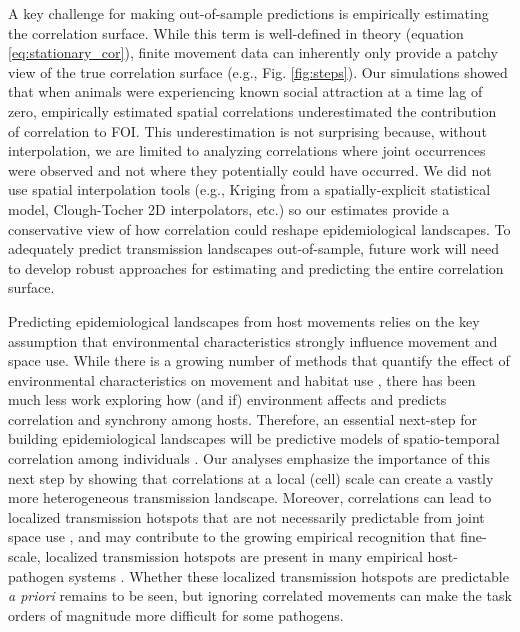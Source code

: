 ﻿\documentclass[11pt]{article}
\begin{document}
A key challenge for making out-of-sample predictions is empirically estimating the correlation surface.  While this term is well-defined in theory (equation \ref{eq:stationary_cor}), finite movement data can inherently only provide a patchy view of the true correlation surface (e.g., Fig. \ref{fig:steps}).  Our simulations showed that when animals were experiencing known social attraction at a time lag of zero, empirically estimated spatial correlations underestimated the contribution of correlation to FOI. This underestimation is not surprising because, without interpolation, we are limited to analyzing correlations where joint occurrences were observed and not where they potentially could have occurred. We did not use spatial interpolation tools (e.g., Kriging from a spatially-explicit statistical model, Clough-Tocher 2D interpolators, etc.) so our estimates provide a conservative view of how correlation could reshape epidemiological landscapes.  To adequately predict transmission landscapes out-of-sample, future work will need to develop robust approaches for estimating and predicting the entire correlation surface. 

Predicting epidemiological landscapes from host movements relies on the key assumption that environmental characteristics strongly influence movement and space use. While there is a growing number of methods that quantify the effect of environmental characteristics on movement and habitat use \citep[reviewed in][]{Hooten2017a}, there has been much less work exploring how (and if) environment affects and predicts correlation and synchrony among hosts.  Therefore, an essential next-step for building epidemiological landscapes will be predictive models of spatio-temporal correlation among individuals \citep[e.g.][]{Brandell2021}.
Our analyses emphasize the importance of this next step by showing that correlations at a local (cell) scale can create a vastly more heterogeneous transmission landscape. Moreover, correlations can lead to localized transmission hotspots that are not necessarily predictable from joint space use \citep{Yang2023a}, and may contribute to the growing empirical recognition that fine-scale, localized transmission hotspots are present in many empirical host-pathogen systems \citep{Albery2021}.  Whether these localized transmission hotspots are predictable \emph{a priori} remains to be seen, but ignoring correlated movements can make the task orders of magnitude more difficult for some pathogens.

\end{document}
